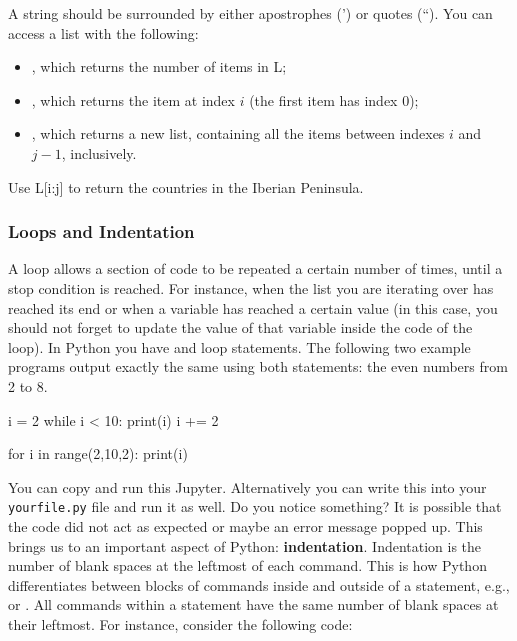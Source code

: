 \noindent A string should be surrounded by either apostrophes (') or quotes (``). You can access a list with the following:

\begin{itemize}
 \item {}, which returns the number of items in L;
 \item {}, which returns the item at index $i$ (the first item has index 0);
 \item {}, which returns a new list, containing all the items between indexes $i$ and $j-1$, inclusively. 
\end{itemize}

\begin{exercise}
 Use L[i:j] to return the countries in the Iberian Peninsula.
\end{exercise}

\subsubsection{Loops and Indentation}

A loop allows a section of code to be repeated a certain number of times, until
a stop condition is reached. For instance, when the list you are iterating over has
reached its end or when a variable has reached a certain value (in this case,
you should not forget to update the value of that variable inside the code of
the loop). In Python you have  and  loop statements. The
following two example programs output exactly the same using both statements:
the even numbers from 2 to 8.

\begin{python}
i = 2
while i < 10:
  print(i)
  i += 2 
\end{python}

\begin{python}
for i in range(2,10,2):
    print(i)
\end{python}

You can copy and run this Jupyter. Alternatively you can write this into your
\texttt{yourfile.py} file and run it as well. Do you notice something? It is possible
that the code did not act as expected or maybe an error message popped up. This
brings us to an important aspect of Python: \textbf{indentation}. Indentation
is the number of blank spaces at the leftmost of each command. This is how
Python differentiates between blocks of commands inside and outside of a
statement, e.g.,  or . All commands within a
statement have the same number of blank spaces at their leftmost. For instance,
consider the following code: 

